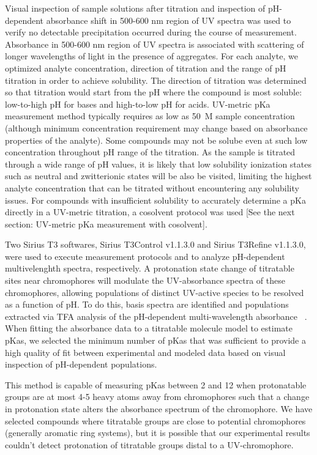 \documentclass[9pt,lineno]{elife}
\begin{document}
Visual inspection of sample solutions after titration and inspection of pH-dependent absorbance shift in 500-600 nm region of UV spectra was used to verify no detectable precipitation occurred during the course of measurement. Absorbance in 500-600 nm region of UV spectra is associated with scattering of longer wavelengths of light in the presence of aggregates. For each analyte, we optimized analyte concentration, direction of titration and the range of pH titration in order to achieve solubility. The direction of titration was determined so that titration would start from the pH where the compound is most soluble: low-to-high pH for bases and high-to-low pH for acids. UV-metric pKa measurement method typically requires as low as 50~\micro M sample concentration (although minimum concentration requirement may change based on absorbance properties of the analyte). Some compounds may not be solube even at such low concentration throughout pH range of the titration. As the sample is titrated through a wide range of pH values, it is likely that low solubility ionization states such as neutral and zwitterionic states will be also be visited, limiting the highest analyte concentration that can be titrated without encountering any solubility issues.  For compounds with insufficient solubility to accurately determine a pKa directly in a UV-metric titration, a cosolvent protocol was used [See the next section: UV-metric pKa measurement with cosolvent]. 

Two Sirius T3 softwares, Sirius T3Control v1.1.3.0 and Sirius T3Refine v1.1.3.0, were used to execute measurement protocols and to analyze pH-dependent multivelenghth spectra, respectively.
A protonation state change of titratable sites near chromophores will modulate the UV-absorbance spectra of these chromophores, allowing populations of distinct UV-active species to be resolved as a function of pH. To do this, basis spectra are identified and populations extracted via TFA analysis of the pH-dependent multi-wavelength absorbance ~\citep{allen_multiwavelength_1998}. When fitting the absorbance data to a titratable molecule model to estimate pKas, we selected the minimum number of pKas that was sufficient to provide a high quality of fit between experimental and modeled data based on visual inspection of pH-dependent populations.

This method is capable of measuring pKas between 2 and 12 when protonatable groups are at most 4-5 heavy atoms away from chromophores such that a change in protonation state alters the absorbance spectrum of the chromophore. We have selected compounds where titratable groups are close to potential chromophores (generally aromatic ring systems), but it is possible that our experimental results couldn't detect protonation of titratable groups distal to a UV-chromophore.
\end{document}
